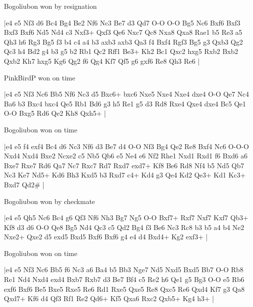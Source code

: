\showboard

Bogoliubon won by resignation

\makegametitle
|e4 e5 Nf3 d6 Bc4 Bg4 Be2 Nf6 Nc3 Be7 d3 Qd7 O-O O-O Bg5 Nc6 Bxf6 Bxf3 Bxf3 Bxf6 Nd5 Nd4 c3 Nxf3+ Qxf3 Qe6 Nxc7 Qc8 Nxa8 Qxa8 Rae1 b5 Re3 a5 Qh3 h6 Rg3 Bg5 f3 b4 c4 a4 b3 axb3 axb3 Qa3 f4 Bxf4 Rgf3 Bg5 g3 Qxb3 Qg2 Qc3 h4 Bd2 g4 b3 g5 b2 Rb1 Qc2 Rff1 Be3+ Kh2 Bc1 Qxc2 hxg5 Rxb2 Bxb2 Qxb2 Kh7 hxg5 Kg6 Qg2 f6 Qg4 Kf7 Qf5 g6 gxf6 Re8 Qh3 Re6  |

\showboard

PinkBirdP won on time

\makegametitle
|e4 e5 Nf3 Nc6 Bb5 Nf6 Nc3 d5 Bxc6+ bxc6 Nxe5 Nxe4 Nxe4 dxe4 O-O Qe7 Nc4 Ba6 b3 Bxc4 bxc4 Qe5 Rb1 Bd6 g3 h5 Re1 g5 d3 Rd8 Rxe4 Qxe4 dxe4 Bc5 Qe1 O-O Bxg5 Rd6 Qe2 Kh8 Qxh5+  |

\showboard

Bogoliubon won on time

\makegametitle
|e4 e5 f4 exf4 Bc4 d6 Nc3 Nf6 d3 Be7 d4 O-O Nf3 Bg4 Qe2 Re8 Bxf4 Nc6 O-O-O Nxd4 Nxd4 Bxe2 Ncxe2 c5 Nb5 Qb6 e5 Ne4 e6 Nf2 Rhe1 Nxd1 Rxd1 f6 Bxd6 a6 Bxe7 Rxe7 Rd6 Qa7 Nc7 Rxc7 Rd7 Rxd7 exd7+ Kf8 Be6 Rd8 Nf4 b5 Nd5 Qb7 Nc3 Ke7 Nd5+ Kd6 Bh3 Kxd5 b3 Rxd7 c4+ Kd4 g3 Qe4 Kd2 Qe3+ Kd1 Kc3+ Bxd7 Qd2\#  |

\showboard

Bogoliubon won by checkmate

\makegametitle
|e4 e5 Qh5 Nc6 Bc4 g6 Qf3 Nf6 Nh3 Bg7 Ng5 O-O Bxf7+ Rxf7 Nxf7 Kxf7 Qb3+ Kf8 d3 d6 O-O Qe8 Bg5 Nd4 Qc3 c5 Qd2 Bg4 f3 Be6 Nc3 Rc8 b3 b5 a4 b4 Ne2 Nxe2+ Qxe2 d5 exd5 Bxd5 Bxf6 Bxf6 g4 e4 d4 Bxd4+ Kg2 exf3+  |

\showboard

Bogoliubon won on time

\makegametitle
|e4 e5 Nf3 Nc6 Bb5 f6 Nc3 a6 Ba4 b5 Bb3 Nge7 Nd5 Nxd5 Bxd5 Bb7 O-O Rb8 Re1 Nd4 Nxd4 exd4 Bxb7 Rxb7 d3 Be7 Bf4 c5 Re2 h6 Qe1 g5 Bg3 O-O e5 Rb6 exf6 Bxf6 Be5 Bxe5 Rxe5 Re6 Rd1 Rxe5 Qxe5 Re8 Qxc5 Re6 Qxd4 Kf7 g3 Qa8 Qxd7+ Kf6 d4 Qf3 Rf1 Re2 Qd6+ Kf5 Qxa6 Rxc2 Qxb5+ Kg4 h3+  |

